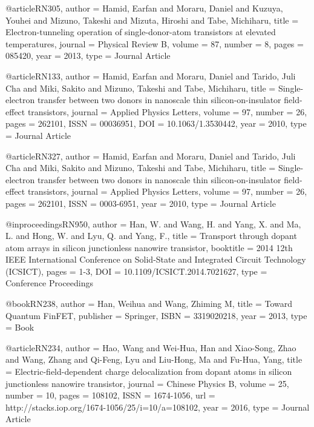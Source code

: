 @article{RN305,
   author = {Hamid, Earfan and Moraru, Daniel and Kuzuya, Youhei and Mizuno, Takeshi and Mizuta, Hiroshi and Tabe, Michiharu},
   title = {Electron-tunneling operation of single-donor-atom transistors at elevated temperatures},
   journal = {Physical Review B},
   volume = {87},
   number = {8},
   pages = {085420},
   year = {2013},
   type = {Journal Article}
}

@article{RN133,
   author = {Hamid, Earfan and Moraru, Daniel and Tarido, Juli Cha and Miki, Sakito and Mizuno, Takeshi and Tabe, Michiharu},
   title = {Single-electron transfer between two donors in nanoscale thin silicon-on-insulator field-effect transistors},
   journal = {Applied Physics Letters},
   volume = {97},
   number = {26},
   pages = {262101},
   ISSN = {00036951},
   DOI = {10.1063/1.3530442},
   year = {2010},
   type = {Journal Article}
}

@article{RN327,
   author = {Hamid, Earfan and Moraru, Daniel and Tarido, Juli Cha and Miki, Sakito and Mizuno, Takeshi and Tabe, Michiharu},
   title = {Single-electron transfer between two donors in nanoscale thin silicon-on-insulator field-effect transistors},
   journal = {Applied Physics Letters},
   volume = {97},
   number = {26},
   pages = {262101},
   ISSN = {0003-6951},
   year = {2010},
   type = {Journal Article}
}

@inproceedings{RN950,
   author = {Han, W. and Wang, H. and Yang, X. and Ma, L. and Hong, W. and Lyu, Q. and Yang, F.},
   title = {Transport through dopant atom arrays in silicon junctionless nanowire transistor},
   booktitle = {2014 12th IEEE International Conference on Solid-State and Integrated Circuit Technology (ICSICT)},
   pages = {1-3},
   DOI = {10.1109/ICSICT.2014.7021627},
   type = {Conference Proceedings}
}

@book{RN238,
   author = {Han, Weihua and Wang, Zhiming M},
   title = {Toward Quantum FinFET},
   publisher = {Springer},
   ISBN = {3319020218},
   year = {2013},
   type = {Book}
}

@article{RN234,
   author = {Hao, Wang and Wei-Hua, Han and Xiao-Song, Zhao and Wang, Zhang and Qi-Feng, Lyu and Liu-Hong, Ma and Fu-Hua, Yang},
   title = {Electric-field-dependent charge delocalization from dopant atoms in silicon junctionless nanowire transistor},
   journal = {Chinese Physics B},
   volume = {25},
   number = {10},
   pages = {108102},
   ISSN = {1674-1056},
   url = {http://stacks.iop.org/1674-1056/25/i=10/a=108102},
   year = {2016},
   type = {Journal Article}
}

